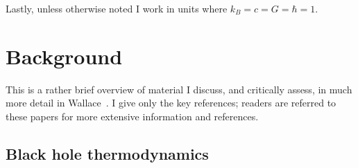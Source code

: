 \documentclass[12pt]{article}
\begin{document}
Lastly, unless otherwise noted I work in units where $k_B=c=G=\hbar=1$.







\section{Background}\label{background}

This is a rather brief overview of material I discuss, and critically assess, in much more detail in Wallace~\citeyear{wallaceblackholethermodynamics,wallaceblackholestatmech}. I give only the key references; readers are referred to these papers for more extensive information and references.

\subsection{Black hole thermodynamics}\label{blackholethermodynamics}
\end{document}
